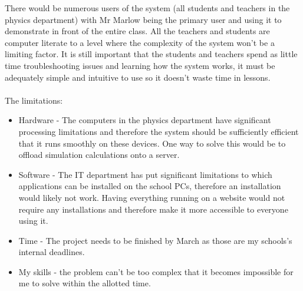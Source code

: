 \documentclass[12pt]{article}
\begin{document}
There would be numerous users of the system (all students and teachers in the physics department) with Mr Marlow being the primary user and using it to demonstrate in front of the entire class. All the teachers and students are computer literate to a level where the complexity of the system won't be a limiting factor. It is still important that the students and teachers spend as little time troubleshooting issues and learning how the system works, it must be adequately simple and intuitive to use so it doesn't waste time in lessons.
\\\\
The limitations:
\begin{itemize}
    \item Hardware - The computers in the physics department have significant processing limitations and therefore the system should be sufficiently efficient that it runs smoothly on these devices. One way to solve this would be to offload simulation calculations onto a server.
    \item Software - The IT department has put significant limitations to which applications can be installed on the school PCs, therefore an installation would likely not work. Having everything running on a website would not require any installations and therefore make it more accessible to everyone using it.
    \item Time - The project needs to be finished by March as those are my schools's internal deadlines.
    \item My skills - the problem can't be too complex that it becomes impossible for me to solve within the allotted time. 
    
\end{itemize}


\newpage
\end{document}
